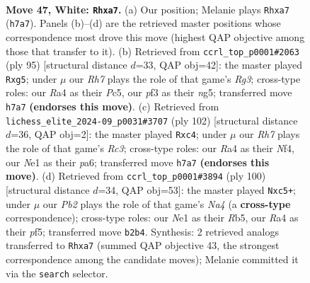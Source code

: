 \documentclass[11pt]{article}
\begin{document}
\clearpage

\begin{figure}[p]\centering
\begin{subfigure}{0.46\textwidth}\centering
\resizebox{\linewidth}{!}{%
\newchessgame
\chessboard[
  setfen={8/p6R/8/2p1k2P/R3p3/5p2/1P6/3KN2r w - - 0 47},
  showmover=false,
  pgfstyle=straightmove, color=movearrow, markmove={h7-a7}
]}
\caption{}
\end{subfigure}\hfill
\begin{subfigure}{0.46\textwidth}\centering
\resizebox{\linewidth}{!}{%
\newchessgame
\chessboard[
  setfen={8/p3R3/6rP/P1p3N1/2P1n3/KP2k3/8/8 b - - 2 48},
  showmover=false,
  pgfstyle=straightmove, color=movearrow, markmove={g6-g5}
]}
\caption{}
\end{subfigure}
\\[4pt]
\begin{subfigure}{0.46\textwidth}\centering
\resizebox{\linewidth}{!}{%
\newchessgame
\chessboard[
  setfen={8/8/p3p3/Pp4k1/2r2N2/2R3K1/2p5/8 w - - 0 52},
  showmover=false,
  pgfstyle=straightmove, color=movearrow, markmove={c3-c4}
]}
\caption{}
\end{subfigure}\hfill
\begin{subfigure}{0.46\textwidth}\centering
\resizebox{\linewidth}{!}{%
\newchessgame
\chessboard[
  setfen={1r6/1Pnk4/6p1/pRp2p2/N7/P7/5K2/8 w - - 1 51},
  showmover=false,
  pgfstyle=straightmove, color=movearrow, markmove={a4-c5}
]}
\caption{}
\end{subfigure}
\caption{\textbf{Move 47, White: \texttt{Rhxa7}.} (a) Our position; Melanie plays \texttt{Rhxa7} (\texttt{h7a7}). Panels (b)--(d) are the retrieved master positions whose correspondence most drove this move (highest QAP objective among those that transfer to it). (b) Retrieved from \texttt{ccrl\_top\_p0001\#2063} (ply 95) [structural distance $d$=33, QAP obj=42]: the master played \texttt{Rxg5}; under $\mu$ our \emph{Rh7} plays the role of that game's \emph{Rg3}; cross-type roles: our \emph{R}a4 as their \emph{P}c5, our \emph{p}f3 as their \emph{n}g5; transferred move \texttt{h7a7} \textbf{(endorses this move)}. (c) Retrieved from \texttt{lichess\_elite\_2024-09\_p0031\#3707} (ply 102) [structural distance $d$=36, QAP obj=2]: the master played \texttt{Rxc4}; under $\mu$ our \emph{Rh7} plays the role of that game's \emph{Rc3}; cross-type roles: our \emph{R}a4 as their \emph{N}f4, our \emph{N}e1 as their \emph{p}a6; transferred move \texttt{h7a7} \textbf{(endorses this move)}. (d) Retrieved from \texttt{ccrl\_top\_p0001\#3894} (ply 100) [structural distance $d$=34, QAP obj=53]: the master played \texttt{Nxc5+}; under $\mu$ our \emph{Pb2} plays the role of that game's \emph{Na4} (a \textbf{cross-type} correspondence); cross-type roles: our \emph{N}e1 as their \emph{R}b5, our \emph{R}a4 as their \emph{p}f5; transferred move \texttt{b2b4}. Synthesis: 2 retrieved analogs transferred to \texttt{Rhxa7} (summed QAP objective 43, the strongest correspondence among the candidate moves); Melanie committed it via the \texttt{search} selector.}
\label{fig:thought-m92}
\end{figure}
\end{document}
